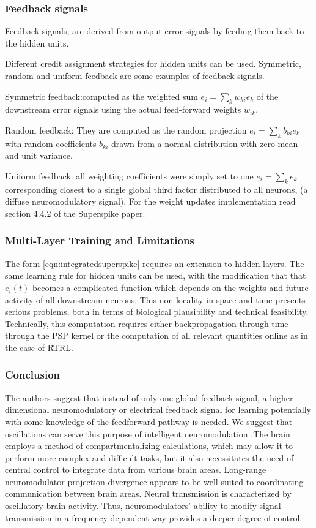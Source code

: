 \documentclass[12pt]{report}
\begin{document}
\subsubsection{Feedback signals}
Feedback signals, are derived from output error signals by feeding them back to the hidden units.

Different credit assignment strategies for hidden units can be used. Symmetric, random and uniform feedback are some examples of feedback signals. 

Symmetric feedback:computed as the weighted sum $e_{i}=\sum_{k} w_{k i} e_{k}$ of the downstream error signals using the actual feed-forward weights $w_{i k} .$  

Random feedback: They are computed as the random projection $e_{i}=\sum_{k} b_{k i} e_{k}$ with random coefficients $b_{k i}$ drawn from a normal distribution with zero mean and unit variance,

Uniform feedback: all weighting coefficients were simply set to one $e_{i}=\sum_{k} e_{k}$ corresponding closest to a single global third factor distributed to all neurons, (a diffuse neuromodulatory signal). For the weight updates implementation read section 4.4.2 of the Superspike paper.
\subsubsection{Multi-Layer Training and Limitations}
The form \ref{eqn:integratedsuperspike} requires an extension to hidden layers. The same learning rule for hidden units can be used, with the modification that that $e_{i}(t)$ becomes a complicated function which depends on the weights and future activity of all downstream neurons. This non-locality in space and time presents serious problems, both in terms of biological plausibility and technical feasibility. Technically, this computation requires either backpropagation through time through the PSP kernel or the computation of all relevant quantities online as in the case of RTRL.
\subsubsection{Conclusion}
The authors suggest that instead of only one global feedback signal, a higher dimensional neuromodulatory or electrical feedback signal for learning potentially with some knowledge of the feedforward pathway is needed. We suggest that oscillations can serve this purpose of intelligent neuromodulation .The brain employs a method of compartmentalizing calculations, which may allow it to perform more complex and difficult tasks, but it also necessitates the need of central control to integrate data from various brain areas. Long-range neuromodulator projection divergence appears to be well-suited to coordinating communication between brain areas. Neural transmission is characterized by oscillatory brain activity. Thus, neuromodulators' ability to modify signal transmission in a frequency-dependent way provides a deeper degree of control.
\end{document}
